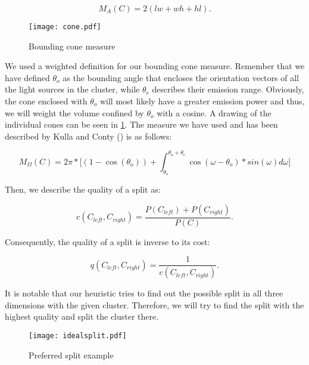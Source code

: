 \begin{equation}
M_A(C) = 2(lw + wh + hl).
\end{equation}

\begin{figure}
	\begin{center}
		\texttt{[image: cone.pdf]}
		\caption{Bounding cone measure}
		\label{fig:cone}
	\end{center}
\end{figure}

We used a weighted definition for our bounding cone measure. Remember that we have defined $\theta_o$ as the bounding angle that encloses the orientation vectors of all the light sources in the cluster, while $\theta_e$ describes their emission range. Obviously, the cone enclosed with $\theta_o$ will most likely have a greater emission power and thus, we will weight the volume confined by $\theta_o$ with a cosine. A drawing of the individual cones can be seen in \ref{fig:cone}. The measure we have used and has been described by Kulla and Conty (\Cite{MLS}) is as follows:

\begin{equation}\label{eq:cone}
M_\Omega(C) = 2\pi * \bigg[(1-\cos(\theta_o)) + \int_{\theta_o}^{\theta_o + \theta_e}\cos(\omega - \theta_o) * sin(\omega)d\omega\bigg]
\end{equation} 

Then, we describe the quality of a split as:

\begin{equation}
c(C_{left}, C_{right}) = \frac{P(C_{left}) + P(C_{right})}{P(C)}.
\end{equation}

Consequently, the quality of a split is inverse to its cost:

\begin{equation}
q(C_{left}, C_{right}) = \frac{1}{c(C_{left}, C_{right})}.
\end{equation}

It is notable that our heuristic tries to find out the possible split in all three dimensions with the given cluster. Therefore, we will try to find the split with the highest quality and split the cluster there.

\begin{figure}
	\begin{center}
		\texttt{[image: idealsplit.pdf]}
		\caption{Preferred split example}
		\label{fig:idealsplit}
	\end{center}
\end{figure}


